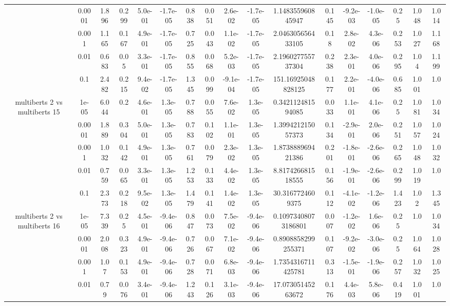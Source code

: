 \begin{tabular}{|c|c|c|c|c|c|c|c|c|c|c|c|c|c|c|c|c|}
 & 0.0001 & 1.896 & 0.299 & 5.0e-01 & -1.7e-05 & 0.838 & 0.051 & 2.6e-02 & -1.7e-05 & 1.148355960845947 & 0.145 & -9.2e-03 & -1.0e-05 & 0.25 & 1.048 & 1.014 \\
 & 0.001 & 1.165 & 0.167 & 4.9e-01 & -1.7e-05 & 0.725 & 0.043 & 1.1e-02 & -1.7e-05 & 2.046305656433105 & 0.18 & 2.8e-02 & 4.3e-06 & 0.253 & 1.027 & 1.168 \\
 & 0.01 & 0.683 & 0.05 & 3.3e-01 & -1.7e-05 & 0.855 & 0.068 & 5.2e-03 & -1.7e-05 & 2.196027755737304 & 0.238 & 2.3e-01 & 4.0e-06 & 0.295 & 1.04 & 1.199 \\
 & 0.1 & 2.482 & 0.215 & 9.4e-02 & -1.7e-05 & 1.345 & 0.099 & -9.1e-04 & -1.7e-05 & 151.16925048828125 & 0.177 & 2.2e-01 & -4.0e-06 & 0.685 & 1.001 & 1.0 \\
\hline
\multirow{5}{*}{multiberts 2 vs multiberts 15} & 1e-05 & 6.044 & 0.2 & 4.6e-01 & 1.3e-05 & 0.788 & 0.055 & 7.6e-02 & 1.3e-05 & 0.342112481594085 & 0.033 & 1.1e-01 & 4.1e-06 & 0.25 & 1.081 & 1.034 \\
 & 0.0001 & 1.889 & 0.304 & 5.0e-01 & 1.3e-05 & 0.783 & 0.102 & 1.1e-01 & 1.3e-05 & 1.399421215057373 & 0.134 & -2.9e-01 & 2.0e-06 & 0.251 & 1.057 & 1.024 \\
 & 0.001 & 1.032 & 0.142 & 4.9e-01 & 1.3e-05 & 0.761 & 0.079 & 2.3e-02 & 1.3e-05 & 1.873888969421386 & 0.201 & -1.8e-01 & -2.6e-06 & 0.265 & 1.048 & 1.032 \\
 & 0.01 & 0.759 & 0.065 & 3.3e-01 & 1.3e-05 & 1.253 & 0.133 & 4.4e-02 & 1.3e-05 & 8.817426681518555 & 0.156 & -1.9e-01 & -2.6e-06 & 0.299 & 1.019 & 1.0 \\
 & 0.1 & 2.373 & 0.218 & 9.5e-02 & 1.3e-05 & 1.479 & 0.141 & 1.4e-02 & 1.3e-05 & 30.3167724609375 & 0.112 & -4.1e-02 & -1.2e-06 & 1.423 & 1.02 & 1.345 \\
\hline
\multirow{5}{*}{multiberts 2 vs multiberts 16} & 1e-05 & 7.339 & 0.25 & 4.5e-01 & -9.4e-06 & 0.847 & 0.073 & 7.5e-02 & -9.4e-06 & 0.10973408073186801 & 0.007 & -1.2e-02 & 1.6e-06 & 0.25 & 1.0 & 1.034 \\
 & 0.0001 & 2.008 & 0.323 & 4.9e-01 & -9.4e-06 & 0.726 & 0.067 & 7.1e-02 & -9.4e-06 & 0.8908858299255371 & 0.107 & -9.2e-02 & -3.0e-06 & 0.25 & 1.064 & 1.028 \\
 & 0.001 & 1.07 & 0.153 & 4.9e-01 & -9.4e-06 & 0.728 & 0.071 & 6.8e-03 & -9.4e-06 & 1.7354316711425781 & 0.313 & -1.5e-01 & -1.9e-06 & 0.257 & 1.032 & 1.025 \\
 & 0.01 & 0.79 & 0.076 & 3.4e-01 & -9.4e-06 & 1.243 & 0.126 & 3.1e-03 & -9.4e-06 & 17.07305145263672 & 0.176 & 4.4e-03 & 5.8e-06 & 0.419 & 1.001 & 1.0 \\

\end{tabular}
